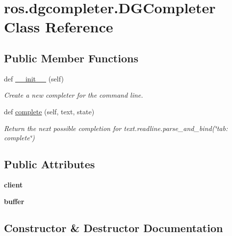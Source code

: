 \hypertarget{classros_1_1dgcompleter_1_1DGCompleter}{}\section{ros.\+dgcompleter.\+D\+G\+Completer Class Reference}
\label{classros_1_1dgcompleter_1_1DGCompleter}
\subsection*{Public Member Functions}
\begin{DoxyCompactItemize}
\item 
def \hyperlink{classros_1_1dgcompleter_1_1DGCompleter_afe3b02de52a32cdeadcefbf6baecacb2}{\+\_\+\+\_\+init\+\_\+\+\_\+} (self)
\begin{DoxyCompactList}\small\item\em Create a new completer for the command line. \end{DoxyCompactList}\item 
def \hyperlink{classros_1_1dgcompleter_1_1DGCompleter_a0662ed6ab4e56fb2a828c5577e03b41e}{complete} (self, text, state)
\begin{DoxyCompactList}\small\item\em Return the next possible completion for \textquotesingle{}text\textquotesingle{}.readline.\+parse\+\_\+and\+\_\+bind(\char`\"{}tab\+: complete\char`\"{}) \end{DoxyCompactList}\end{DoxyCompactItemize}
\subsection*{Public Attributes}
\begin{DoxyCompactItemize}
\item 
{\bfseries client}\hypertarget{classros_1_1dgcompleter_1_1DGCompleter_afcab03fb8dcc2ed3b536d76369037cde}{}\label{classros_1_1dgcompleter_1_1DGCompleter_afcab03fb8dcc2ed3b536d76369037cde}

\item 
{\bfseries buffer}\hypertarget{classros_1_1dgcompleter_1_1DGCompleter_a7e95fab5df0d74bfb1e90dc4cea6d901}{}\label{classros_1_1dgcompleter_1_1DGCompleter_a7e95fab5df0d74bfb1e90dc4cea6d901}

\end{DoxyCompactItemize}


\subsection{Constructor \& Destructor Documentation}
